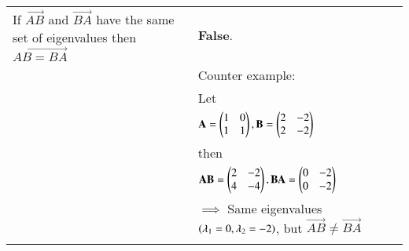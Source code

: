 \begin{table*}[h]
\begin{tabular}{|m{3cm}|m{14cm}|}
		If $\vec{AB}$ and $\vec{BA}$ have the same set of eigenvalues then $\vec{AB=BA}$
		& \textbf{False}. \\
		&Counter example:\\
		& Let\\
		& \qquad\qquad\qquad$\mathbf{A} = \begin{pmatrix}1 & 0 \\ 1 & 1\end{pmatrix}, \mathbf{B} = \begin{pmatrix}2 & -2 \\ 2 & -2\end{pmatrix}$\\
	    &then\\
	    & \qquad\qquad\qquad$\mathbf{AB} = \begin{pmatrix}2 & -2 \\ 4 & -4\end{pmatrix}, \mathbf{BA} = \begin{pmatrix}0 & -2 \\ 0 & -2\end{pmatrix}$\\
        & $\implies$ Same eigenvalues $\left(\lambda_1 = 0, \lambda_2 = -2\right)$, but $\vec{AB} \ne \vec{BA}$
		\\
		&\\
		\hline
			\end{tabular}
\caption{}
\label{eq:solutions/2015/dec/75/tab:1}
	\end{table*}
